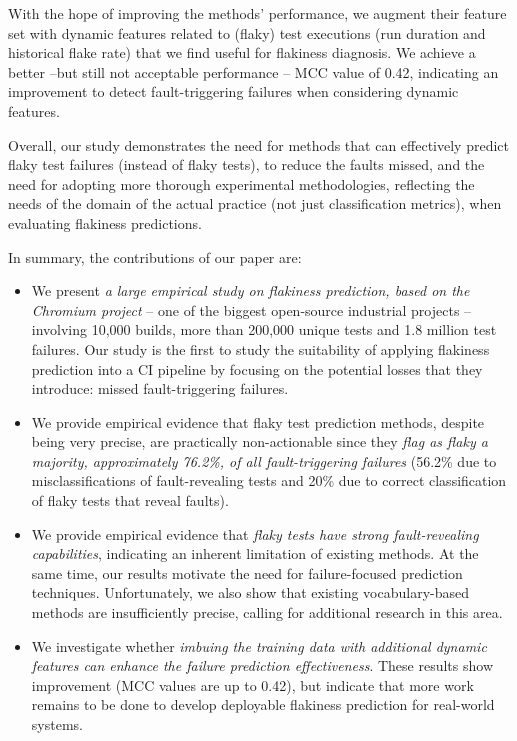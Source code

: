 With the hope of improving the methods' performance, we augment their feature set with dynamic features related to (flaky) test executions (\eg run duration and historical flake rate) that we find useful for flakiness diagnosis. We achieve a better --but still not acceptable performance -- MCC value of 0.42, indicating an improvement to detect fault-triggering failures when considering dynamic features. 

Overall, our study demonstrates the need for methods that can effectively predict flaky test failures (instead of flaky tests), to reduce the faults missed, and the need for adopting more thorough experimental methodologies, reflecting the needs of the domain of the actual practice (not just classification metrics), when evaluating flakiness predictions. 

In summary, the contributions of our paper are:
\begin{itemize}
    \item We present \textit{a large empirical study on flakiness prediction, based on the Chromium project} -- one of the biggest open-source industrial projects -- involving 10,000 builds, more than 200,000 unique tests and 1.8 million test failures. Our study is the first to study the suitability of applying flakiness prediction into a CI pipeline by focusing on the potential losses that they introduce: missed fault-triggering failures.  
    
    \item We provide empirical evidence that flaky test prediction methods, despite being very precise, are practically non-actionable since they \textit{flag as flaky a majority, approximately 76.2\%, of all fault-triggering failures} (56.2\% due to misclassifications of fault-revealing tests and 20\% due to correct classification of flaky tests that reveal faults).

    \item We provide empirical evidence that \textit{flaky tests have strong fault-revealing capabilities}, indicating an inherent limitation of existing methods. At the same time, our results motivate the need for failure-focused prediction techniques. Unfortunately, we also show that existing vocabulary-based methods are insufficiently precise, calling for additional research in this area.  

    \item We investigate whether \textit{imbuing the training data with additional dynamic features can enhance the failure prediction effectiveness}. These results show  improvement (MCC values are up to 0.42), but indicate that more work remains to be done to develop deployable flakiness prediction for real-world systems.
   
\end{itemize}





